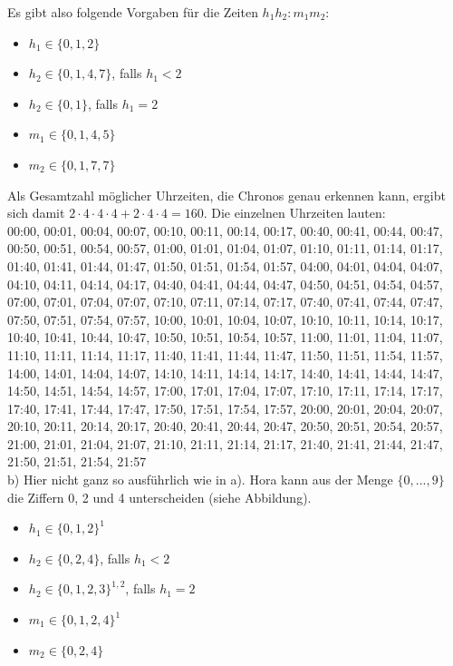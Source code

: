 \documentclass{scrartcl}
\begin{document}
Es gibt also folgende Vorgaben für die Zeiten $h_1h_2:m_1m_2$:

\begin{itemize}
\item{$h_1 \in \{0, 1, 2\}$}
\item{$h_2 \in \{0, 1, 4, 7\}$, falls $h_1 < 2$}
\item{$h_2 \in \{0, 1\}$, falls $h_1 = 2$}
\item{$m_1 \in \{0, 1, 4, 5\}$}
\item{$m_2 \in \{0, 1, 7, 7\}$}
\end{itemize}

Als Gesamtzahl möglicher Uhrzeiten, die Chronos genau erkennen kann, ergibt sich damit
$2 \cdot 4 \cdot 4 \cdot 4 + 2 \cdot 4 \cdot 4 = 160.$ Die einzelnen Uhrzeiten lauten: \\

00:00, 00:01, 00:04, 00:07, 00:10, 00:11, 00:14, 00:17, 00:40, 00:41, 00:44, 00:47,
00:50, 00:51, 00:54, 00:57, 01:00, 01:01, 01:04, 01:07, 01:10, 01:11, 01:14, 01:17, 01:40, 
01:41, 01:44, 01:47, 01:50, 01:51, 01:54, 01:57, 04:00, 04:01, 04:04, 04:07, 04:10, 04:11, 
04:14, 04:17, 04:40, 04:41, 04:44, 04:47, 04:50, 04:51, 04:54, 04:57, 07:00, 07:01, 07:04, 
07:07, 07:10, 07:11, 07:14, 07:17, 07:40, 07:41, 07:44, 07:47, 07:50, 07:51, 07:54, 07:57,
10:00, 10:01, 10:04, 10:07, 10:10, 10:11, 10:14, 10:17, 10:40, 10:41, 10:44, 10:47, 10:50, 
10:51, 10:54, 10:57, 11:00, 11:01, 11:04, 11:07, 11:10, 11:11, 11:14, 11:17, 11:40, 11:41, 
11:44, 11:47, 11:50, 11:51, 11:54, 11:57, 14:00, 14:01, 14:04, 14:07, 14:10, 14:11, 14:14, 
14:17, 14:40, 14:41, 14:44, 14:47, 14:50, 14:51, 14:54, 14:57, 17:00, 17:01, 17:04, 17:07, 
17:10, 17:11, 17:14, 17:17, 17:40, 17:41, 17:44, 17:47, 17:50, 17:51, 17:54, 17:57, 20:00, 
20:01, 20:04, 20:07, 20:10, 20:11, 20:14, 20:17, 20:40, 20:41, 20:44, 20:47, 20:50, 20:51,
20:54, 20:57, 21:00, 21:01, 21:04, 21:07, 21:10, 21:11, 21:14, 21:17, 21:40, 21:41, 21:44,
21:47, 21:50, 21:51, 21:54, 21:57 \\

b) Hier nicht ganz so ausführlich wie in a). Hora kann aus der Menge $\{0, ..., 9\}$ die Ziffern
0, 2 und 4 unterscheiden (siehe Abbildung).

\begin{itemize}
\item{$h_1 \in \{0, 1, 2\}^1$}
\item{$h_2 \in \{0, 2, 4\}$, falls $h_1 < 2$}
\item{$h_2 \in \{0, 1, 2, 3\}^{1,2}$, falls $h_1 = 2$}
\item{$m_1 \in \{0, 1, 2, 4\}^1$}
\item{$m_2 \in \{0, 2, 4\}$}
\end{itemize}
\end{document}
